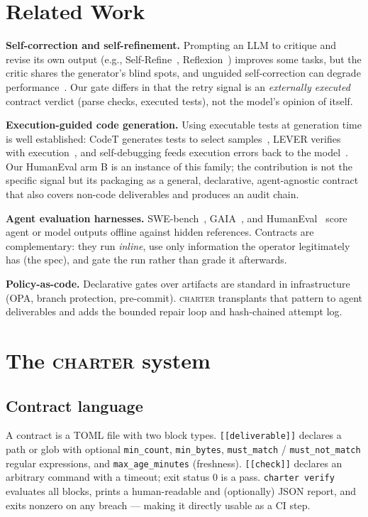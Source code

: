 \documentclass{article}
\begin{document}
\section{Related Work}

\textbf{Self-correction and self-refinement.} Prompting an LLM to critique and revise
its own output (e.g., Self-Refine~\cite{madaan2023selfrefine},
Reflexion~\cite{shinn2023reflexion}) improves some tasks, but the critic shares the
generator's blind spots, and unguided self-correction can degrade
performance~\cite{huang2024large}. Our gate differs in that the retry signal is an
\emph{externally executed} contract verdict (parse checks, executed tests), not the
model's opinion of itself.

\textbf{Execution-guided code generation.} Using executable tests at generation time
is well established: CodeT generates tests to select samples~\cite{chen2022codet},
LEVER verifies with execution~\cite{ni2023lever}, and self-debugging feeds execution
errors back to the model~\cite{chen2023selfdebug}. Our HumanEval arm B is an instance
of this family; the contribution is not the specific signal but its packaging as a
general, declarative, agent-agnostic contract that also covers non-code deliverables
and produces an audit chain.

\textbf{Agent evaluation harnesses.} SWE-bench~\cite{jimenez2024swebench},
GAIA~\cite{mialon2023gaia}, and HumanEval~\cite{chen2021humaneval} score agent or
model outputs offline against hidden references. Contracts are complementary: they
run \emph{inline}, use only information the operator legitimately has (the spec), and
gate the run rather than grade it afterwards.

\textbf{Policy-as-code.} Declarative gates over artifacts are standard in
infrastructure (OPA, branch protection, pre-commit). \textsc{charter} transplants
that pattern to agent deliverables and adds the bounded repair loop and hash-chained
attempt log.

\section{The \textsc{charter} system}

\subsection{Contract language}
A contract is a TOML file with two block types. \texttt{[[deliverable]]} declares a
path or glob with optional \texttt{min\_count}, \texttt{min\_bytes},
\texttt{must\_match} / \texttt{must\_not\_match} regular expressions, and
\texttt{max\_age\_minutes} (freshness). \texttt{[[check]]} declares an arbitrary
command with a timeout; exit status 0 is a pass. \texttt{charter verify} evaluates
all blocks, prints a human-readable and (optionally) JSON report, and exits nonzero
on any breach --- making it directly usable as a CI step.
\end{document}
